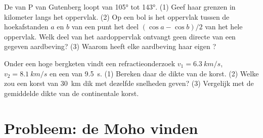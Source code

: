 \begin{exercise}[$\star\star\star$]\label{exo:g11:seismic-structure:14}
De  van P van Gutenberg loopt van \ang{105} tot \ang{143}. (1) Geef
haar grenzen in kilometer langs het oppervlak. (2) Op een bol is het oppervlak
tussen de hoekafstanden $a$ en $b$ van een punt het deel $(\cos a - \cos
b)/2$ van het hele oppervlak. Welk deel van het aardoppervlak ontvangt geen directe
 van een gegeven aardbeving? (3) Waarom heeft elke aardbeving haar eigen
?
\end{exercise}

\begin{exercise}[$\star\star\star$]\label{exo:g11:seismic-structure:15}
Onder een hoge bergketen vindt een refractieonderzoek $v_1 =
\qty{6.3}{km/s}$, $v_2 = \qty{8.1}{km/s}$ en een  van
\qty{9.5}{s}. (1) Bereken daar de dikte van de korst. (2) Welke  zou
een korst van \qty{30}{km} dik met dezelfde snelheden geven?
(3) Vergelijk met de gemiddelde dikte van de continentale korst.
\end{exercise}

\section{Probleem: de Moho vinden}


